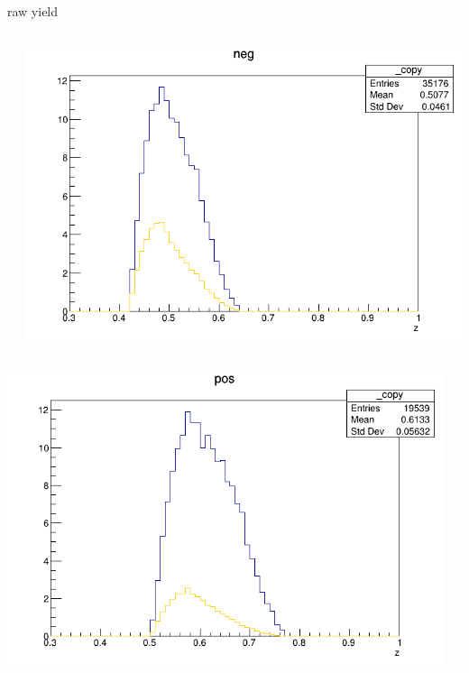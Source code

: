 \begin{frame}{raw yield}
\begin{columns}
\begin{column}[T]{0.25\textwidth}
\end{column}
\begin{column}[T]{0.25\textwidth}
\includegraphics[width = \textwidth]{results/yield/statistics/yield_x_Q2_z_0.45_4.750_0.50_neg.png}
\end{column}
\end{columns}
\begin{columns}
\begin{column}[T]{0.25\textwidth}
\includegraphics[width = \textwidth]{results/yield/statistics/yield_x_Q2_z_0.45_4.750_0.60_pos.png}
\end{column}
\begin{column}[T]{0.25\textwidth}

\end{column}
\end{columns}
\end{frame}
